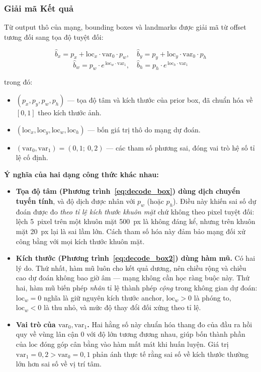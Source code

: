 \subsubsection{Giải mã Kết quả}

Từ output thô của mạng, bounding boxes và landmarks được giải mã từ offset tương đối sang tọa độ tuyệt đối:

\begin{equation}
\label{eq:decode_box}
\hat{b}_x = p_x + \text{loc}_x \cdot \text{var}_0 \cdot p_w, \quad
\hat{b}_y = p_y + \text{loc}_y \cdot \text{var}_0 \cdot p_h
\end{equation}
\begin{equation}
\label{eq:decode_box2}
\hat{b}_w = p_w \cdot e^{\,\text{loc}_w \cdot \text{var}_1}, \quad
\hat{b}_h = p_h \cdot e^{\,\text{loc}_h \cdot \text{var}_1}
\end{equation}

\noindent trong đó:
\begin{itemize}
    \item $(p_x, p_y, p_w, p_h)$ --- tọa độ tâm và kích thước của prior box, đã chuẩn hóa về $[0,1]$ theo kích thước ảnh.
    \item $(\text{loc}_x, \text{loc}_y, \text{loc}_w, \text{loc}_h)$ --- bốn giá trị thô do mạng dự đoán.
    \item $(\text{var}_0, \text{var}_1) = (0{,}1;\ 0{,}2)$ --- các tham số phương sai, đóng vai trò hệ số tỉ lệ cố định.
\end{itemize}

\textbf{Ý nghĩa của hai dạng công thức khác nhau:}
\begin{itemize}
    \item \textbf{Tọa độ tâm (Phương trình~\ref{eq:decode_box}) dùng dịch chuyển tuyến tính}, và độ dịch được nhân với $p_w$ (hoặc $p_h$). Điều này khiến sai số dự đoán được đo \textit{theo tỉ lệ kích thước khuôn mặt} chứ không theo pixel tuyệt đối: lệch 5~pixel trên một khuôn mặt 500~px là không đáng kể, nhưng trên khuôn mặt 20~px lại là sai lầm lớn. Cách tham số hóa này đảm bảo mạng đối xử công bằng với mọi kích thước khuôn mặt.
    \item \textbf{Kích thước (Phương trình~\ref{eq:decode_box2}) dùng hàm mũ.} Có hai lý do. Thứ nhất, hàm mũ luôn cho kết quả dương, nên chiều rộng và chiều cao dự đoán không bao giờ âm --- mạng không cần học ràng buộc này. Thứ hai, hàm mũ biến phép \textit{nhân} tỉ lệ thành phép \textit{cộng} trong không gian dự đoán: $\text{loc}_w = 0$ nghĩa là giữ nguyên kích thước anchor, $\text{loc}_w > 0$ là phóng to, $\text{loc}_w < 0$ là thu nhỏ, và mức độ thay đổi đối xứng theo tỉ lệ.
    \item \textbf{Vai trò của $\text{var}_0, \text{var}_1$.} Hai hằng số này chuẩn hóa thang đo của đầu ra hồi quy về vùng lân cận 0 với độ lớn tương đương nhau, giúp bốn thành phần của $\text{loc}$ đóng góp cân bằng vào hàm mất mát khi huấn luyện. Giá trị $\text{var}_1 = 0{,}2 > \text{var}_0 = 0{,}1$ phản ánh thực tế rằng sai số về kích thước thường lớn hơn sai số về vị trí tâm.
\end{itemize}

